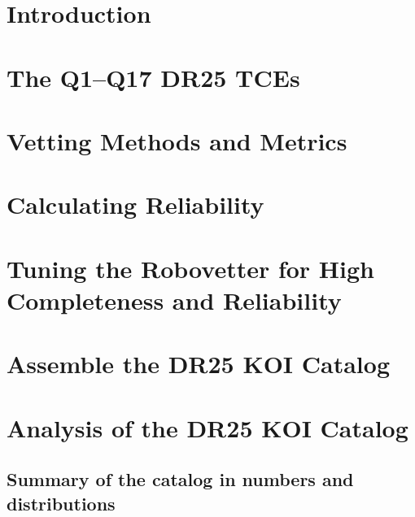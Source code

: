 \documentclass[apj,twocolappendix,numberedappendix]{emulateapj}
\renewcommand{\_}{\discretionary{\underscore}{}{\underscore}}  %
\begin{document}
\begin{abstract}
\end{abstract}


\section{Introduction}



\section{The Q1--Q17 DR25 TCEs}
\label{tcesec}




\section{Vetting Methods and Metrics}


\section{Calculating Reliability}


\section{Tuning the Robovetter for High Completeness and Reliability}



\section{Assemble the DR25 KOI Catalog}



\section{Analysis of the DR25 KOI Catalog}

\subsection{Summary of the catalog in numbers and distributions}

\end{document}

